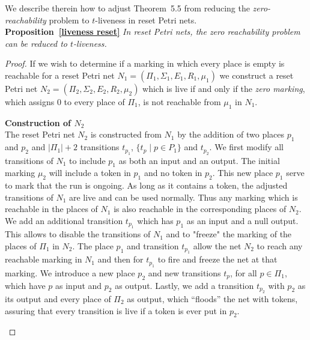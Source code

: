 We describe therein how to adjust Theorem~5.5 from \cite{peterson1981petri} reducing the {\em zero-reachability} problem to {\sc $t$-liveness} in reset Petri nets. \\


\noindent
\textbf{Proposition~\ref{liveness reset}}
{\em In reset Petri nets, the zero reachability problem can be reduced to {\sc $t$-liveness}.}



\begin{proof}


If we wish to determine if a marking in which every place is empty is reachable for a reset Petri net
 $N_1 = (\Pi_1, \Sigma_1, E_1, R_1, \mu_1)$ %
 we construct a reset Petri net
 $N_2 = (\Pi_2, \Sigma_2, E_2, R_2, \mu_2)$ %
  which is live if and only if the {\em zero marking}, which assigns $0$ to every place of $\Pi_1$, is not reachable from $\mu_1$ in $N_1$. \\

\begin{samepage}
{\bf Construction of $N_2$} \\
\indent
The reset Petri net $N_2$ is constructed from $N_1$ by the addition of two places $p_1$ and $p_2$ and $|\Pi_1| +2$ transitions $t_{p_1}$, $\{ t_p \mid p \in P_1 \}$ and $t_{p_2}$.
We first modify all transitions of $N_1$ to include $p_1$ as both an input and an output.
The initial marking $\mu_2$ will include a token in $p_1$ and no token in $p_2$. 
This new place $p_1$ serve to mark that the run is ongoing. As long as it contains a token, the adjusted transitions of $N_1$ are live and can be used normally. Thus any marking which is reachable in the places of $N_1$ is also reachable in the corresponding places of $N_2$.
We add an additional transition $t_{p_1}$ %
which has $p_1$ as an input and a null output.
This allows to disable the transitions of $N_1$ and to "freeze" the marking of the places of $\Pi_1$ in $N_2$.
 The place $p_1$ and transition $t_{p_1}$ allow the net $N_2$ to reach any reachable marking in $N_1$ and then for $t_{p_1}$ to fire and freeze the net at that marking.
We introduce a new place $p_2$ and new transitions $t_p$, for all $p \in \Pi_1$, which have $p$ as input and $p_2$ as output.
Lastly, we add a transition $t_{p_2}$ with $p_2$ as its output and every place of $\Pi_2$ as output, which ``floods'' the net with tokens, assuring that every transition is live if a token is ever
put in $p_2$.
\end{samepage}


\end{proof}

